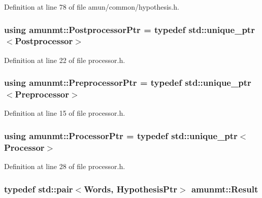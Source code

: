 Definition at line 78 of file amun/common/hypothesis.\+h.

\subsubsection[{\texorpdfstring{Postprocessor\+Ptr}{PostprocessorPtr}}]{\setlength{\rightskip}{0pt plus 5cm}using {\bf amunmt\+::\+Postprocessor\+Ptr} = typedef std\+::unique\+\_\+ptr$<${\bf Postprocessor}$>$}\hypertarget{namespaceamunmt_a93da118427da6be237f0407643816798}{}\label{namespaceamunmt_a93da118427da6be237f0407643816798}


Definition at line 22 of file processor.\+h.

\subsubsection[{\texorpdfstring{Preprocessor\+Ptr}{PreprocessorPtr}}]{\setlength{\rightskip}{0pt plus 5cm}using {\bf amunmt\+::\+Preprocessor\+Ptr} = typedef std\+::unique\+\_\+ptr$<${\bf Preprocessor}$>$}\hypertarget{namespaceamunmt_a01f8e038a68167c344d9e40146064712}{}\label{namespaceamunmt_a01f8e038a68167c344d9e40146064712}


Definition at line 15 of file processor.\+h.

\subsubsection[{\texorpdfstring{Processor\+Ptr}{ProcessorPtr}}]{\setlength{\rightskip}{0pt plus 5cm}using {\bf amunmt\+::\+Processor\+Ptr} = typedef std\+::unique\+\_\+ptr$<${\bf Processor}$>$}\hypertarget{namespaceamunmt_a2ff87af5187af8bbedac18dd10c48162}{}\label{namespaceamunmt_a2ff87af5187af8bbedac18dd10c48162}


Definition at line 28 of file processor.\+h.

\subsubsection[{\texorpdfstring{Result}{Result}}]{\setlength{\rightskip}{0pt plus 5cm}typedef std\+::pair$<${\bf Words}, {\bf Hypothesis\+Ptr}$>$ {\bf amunmt\+::\+Result}}\hypertarget{namespaceamunmt_af12bd731cf50f363bdcbec0f435bafb1}{}\label{namespaceamunmt_af12bd731cf50f363bdcbec0f435bafb1}


